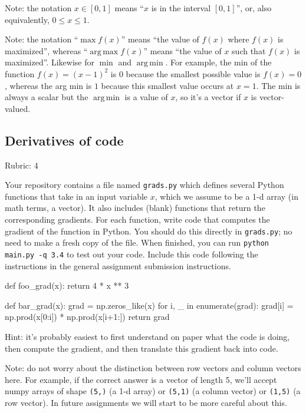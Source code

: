 \documentclass{article}
\newcommand{\rubric}[1]{\green{Rubric: #1}}
\newcommand{\blue}[1]{{\color{blue}#1}}
\newcommand{\green}[1]{{\color{green}#1}}
\DeclareMathOperator*\argmax{arg\,max}
\DeclareMathOperator*\argmin{arg\,min}
\begin{document}
    Note: the notation $x\in [0,1]$ means ``$x$ is in the interval $[0,1]$'', or, also equivalently, $0 \leq x \leq 1$.

    Note: the notation ``$\max f(x)$'' means ``the value of $f(x)$ where $f(x)$ is maximized'', whereas ``$\argmax f(x)$'' means ``the value of $x$ such that $f(x)$ is maximized''.
    Likewise for $\min$ and $\argmin$. For example, the min of the function $f(x)=(x-1)^2$ is $0$ because the smallest possible value is $f(x)=0$,
    whereas the arg min is $1$ because this smallest value occurs at $x=1$. The min is always a scalar but the $\argmin$ is a value of $x$, so it's a vector
    if $x$ is vector-valued.

    \subsection{Derivatives of code}
    \rubric{4}

    Your repository contains a file named \texttt{grads.py} which defines several Python functions that take in an input variable $x$, which we assume to be a 1-d array (in math terms, a vector).
    It also includes (blank) functions that return the corresponding gradients.
    For each function, \blue{write code that computes the gradient of the function} in Python.
    You should do this directly in \texttt{grads.py}; no need to make a fresh copy of the file. When finished, you can run \texttt{python main.py -q 3.4} to test out your code. \blue{Include this code following the instructions in the general assignment submission instructions.}

    \begin{python}
    def foo_grad(x):
        return 4 * x ** 3

    def bar_grad(x):
        grad = np.zeros_like(x)
        for i, _ in enumerate(grad):
            grad[i] = np.prod(x[0:i]) * np.prod(x[i+1:])
        return grad
    \end{python}

    Hint: it's probably easiest to first understand on paper what the code is doing, then compute
    the gradient, and then translate this gradient back into code.

    Note: do not worry about the distinction between row vectors and column vectors here.
    For example, if the correct answer is a vector of length 5, we'll accept numpy arrays
    of shape \texttt{(5,)} (a 1-d array) or \texttt{(5,1)} (a column vector) or
    \texttt{(1,5)} (a row vector). In future assignments we will start to be more careful
    about this.
\end{document}
